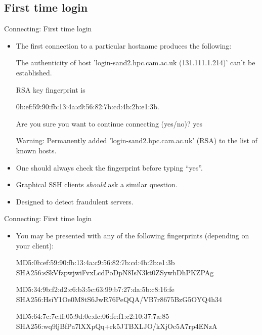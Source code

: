 \subsection{First time login}
\begin{frame}{Connecting: First time login}
\begin{itemize}
\item{The first connection to a particular hostname produces the following:}
\begin{semiverbatim}\footnotesize
The authenticity of host 'login-sand2.hpc.cam.ac.uk (131.111.1.214)' can't be established.

RSA key fingerprint is

{0b:ef:59:90:fb:13:4a:c9:56:82:7b:cd:4b:2b:e1:3b}.

Are you sure you want to continue connecting (yes/no)? {yes}

Warning: Permanently added 'login-sand2.hpc.cam.ac.uk' (RSA) to the list of known hosts.
\end{semiverbatim}
\smallskip\item{\alert{One should always check the fingerprint before typing ``yes''.}}
\item{Graphical SSH clients \emph{should} ask a similar question.}
\item{Designed to detect fraudulent servers.}
\end{itemize}
\end{frame}

\begin{frame}[fragile]{Connecting: First time login}
\begin{itemize}
\item{You may be presented with any of the following fingerprints (depending on your client):}
\begin{semiverbatim}\footnotesize

MD5:0b:ef:59:90:fb:13:4a:c9:56:82:7b:cd:4b:2b:e1:3b
SHA256:sSkVfzpwjwiFvxLcdPoDpN8IsN3kt0ZSywhDhPKZPAg

MD5:34:9b:f2:d2:c6:b3:5c:63:99:b7:27:da:5b:c8:16:fe
SHA256:HsiY1Oe0M8tS6JwR76PeQQA/VB7r8675BzG5OYQ4h34

MD5:64:7c:7c:ff:05:9d:0e:dc:06:fe:f1:c2:10:37:7a:85
SHA256:wq9ljBfPa7lXXpQq+rk5JTBXLJO/kXjOc5A7rp4ENzA

\end{semiverbatim}
\end{itemize}
\end{frame}

